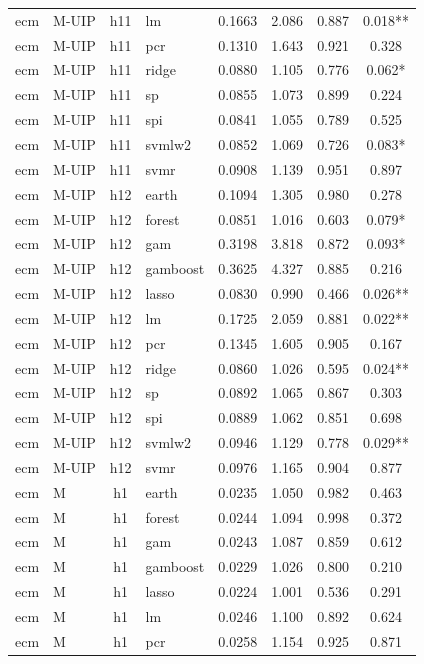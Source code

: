 \begin{ThreePartTable}
\begin{longtable}[t]{llclcccc}
ecm & M-UIP & h11 & lm & 0.1663 & 2.086 & 0.887 & 0.018**\\
ecm & M-UIP & h11 & pcr & 0.1310 & 1.643 & 0.921 & 0.328\\
ecm & M-UIP & h11 & ridge & 0.0880 & 1.105 & 0.776 & 0.062*\\
ecm & M-UIP & h11 & sp & 0.0855 & 1.073 & 0.899 & 0.224\\
ecm & M-UIP & h11 & spi & 0.0841 & 1.055 & 0.789 & 0.525\\
ecm & M-UIP & h11 & svmlw2 & 0.0852 & 1.069 & 0.726 & 0.083*\\
ecm & M-UIP & h11 & svmr & 0.0908 & 1.139 & 0.951 & 0.897\\
\addlinespace
ecm & M-UIP & h12 & earth & 0.1094 & 1.305 & 0.980 & 0.278\\
ecm & M-UIP & h12 & forest & 0.0851 & 1.016 & 0.603 & 0.079*\\
ecm & M-UIP & h12 & gam & 0.3198 & 3.818 & 0.872 & 0.093*\\
ecm & M-UIP & h12 & gamboost & 0.3625 & 4.327 & 0.885 & 0.216\\
ecm & M-UIP & h12 & lasso & 0.0830 & 0.990 & 0.466 & 0.026**\\
ecm & M-UIP & h12 & lm & 0.1725 & 2.059 & 0.881 & 0.022**\\
ecm & M-UIP & h12 & pcr & 0.1345 & 1.605 & 0.905 & 0.167\\
ecm & M-UIP & h12 & ridge & 0.0860 & 1.026 & 0.595 & 0.024**\\
ecm & M-UIP & h12 & sp & 0.0892 & 1.065 & 0.867 & 0.303\\
ecm & M-UIP & h12 & spi & 0.0889 & 1.062 & 0.851 & 0.698\\
ecm & M-UIP & h12 & svmlw2 & 0.0946 & 1.129 & 0.778 & 0.029**\\
ecm & M-UIP & h12 & svmr & 0.0976 & 1.165 & 0.904 & 0.877\\
\addlinespace
ecm & M & h1 & earth & 0.0235 & 1.050 & 0.982 & 0.463\\
ecm & M & h1 & forest & 0.0244 & 1.094 & 0.998 & 0.372\\
ecm & M & h1 & gam & 0.0243 & 1.087 & 0.859 & 0.612\\
ecm & M & h1 & gamboost & 0.0229 & 1.026 & 0.800 & 0.210\\
ecm & M & h1 & lasso & 0.0224 & 1.001 & 0.536 & 0.291\\
ecm & M & h1 & lm & 0.0246 & 1.100 & 0.892 & 0.624\\
ecm & M & h1 & pcr & 0.0258 & 1.154 & 0.925 & 0.871\\

\end{longtable}
\end{ThreePartTable}

